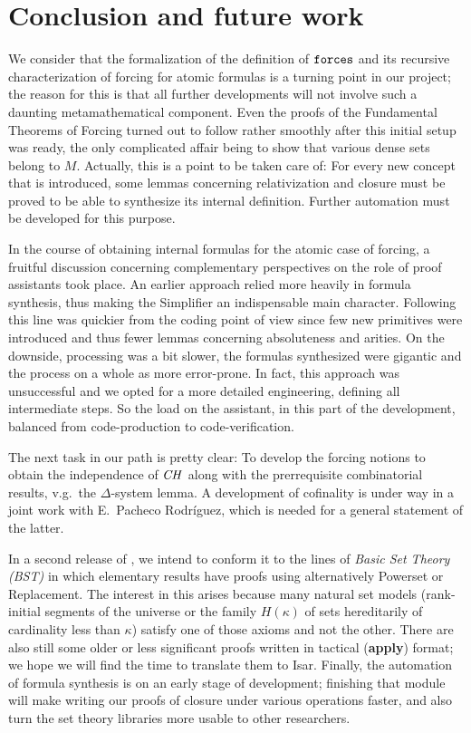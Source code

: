 \section{Conclusion and future work}
\label{sec:conclusion}

We consider that the formalization of the definition of $\mathop{\mathtt{forces}}$
and its recursive characterization of forcing for atomic formulas is
a turning point
in our project; the reason for this is that all further
developments will not involve such a daunting metamathematical
component. Even the proofs of the Fundamental Theorems of Forcing
turned out to follow rather smoothly after this initial setup was
ready, the only complicated affair being to show that various dense sets belong
to $M$. 
%
Actually, this is a point to be taken care of: For every new
concept that is introduced, some lemmas concerning 
relativization and closure must be proved to be able to synthesize its
internal definition. Further automation must be developed for this
purpose.

In the course of obtaining internal formulas for the atomic case of
forcing, a fruitful discussion
concerning complementary perspectives on the role of proof assistants
took place. An earlier approach relied more heavily in formula
synthesis, thus making the Simplifier an indispensable main
character. Following this line was quickier from the coding point of
view since few new primitives were introduced and thus fewer lemmas
concerning absoluteness and arities. On the downside, processing was a
bit slower, the formulas synthesized were gigantic and the process on
a whole as more error-prone. In fact, this approach was unsuccessful
and we opted for a more detailed engineering, defining all
intermediate steps. So the load on the assistant, in this part of the
development, balanced from code-production to code-verification. 

The next task in our path is pretty clear: To develop the forcing
notions to obtain the independence of $\mathit{CH}$ 
along with the prerrequisite combinatorial results, v.g.\ the
$\Delta$-system lemma. A development of cofinality is under way in a
joint work with E.~Pacheco Rodríguez, which is needed for a general
statement of the latter. 

In a second release of , we intend to conform
it to the lines of \emph{Basic Set Theory (BST)}
\cite[I.3.1]{kunen2011set} in which elementary results have proofs
using alternatively Powerset or Replacement. The interest in this
arises because many natural set models (rank-initial segments of the
universe or the family $H(\kappa)$ of sets hereditarily of cardinality
less than $\kappa$) satisfy one of those axioms and not the
other. There are also still some older or less significant proofs
written in tactical (\textbf{apply}) format; we hope we will find the
time to translate them to Isar. Finally, the automation of formula
synthesis is on an early stage of development; finishing that module
will make writing our proofs of closure under various operations
faster, and also turn the set theory libraries  more
usable to other researchers.

